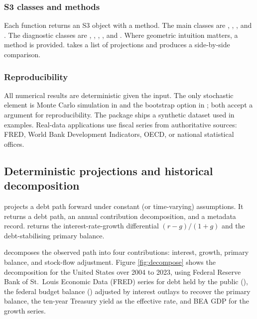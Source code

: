 \subsubsection{S3 classes and methods}\label{s3-classes-and-methods}

Each function returns an S3 object with a  method. The
main classes are , ,
, and . The diagnostic classes are
, , ,
, and . Where geometric
intuition matters, a  method is provided.
 takes a list of projections and produces a
side-by-side comparison.

\subsubsection{Reproducibility}\label{reproducibility}

All numerical results are deterministic given the input. The only
stochastic element is Monte Carlo simulation in 
and the bootstrap option in ; both accept a
 argument for reproducibility. The package ships a synthetic
 dataset used in examples. Real-data
applications use fiscal series from authoritative sources: FRED, World
Bank Development Indicators, OECD, or national statistical offices.

\subsection{Deterministic projections and historical
decomposition}\label{deterministic-projections-and-historical-decomposition}

 projects a debt path forward under constant (or
time-varying) assumptions. It returns a debt path, an annual
contribution decomposition, and a metadata record. 
returns the interest-rate-growth differential \((r-g)/(1+g)\) and the
debt-stabilising primary balance.

 decomposes the observed path into four contributions: interest,
growth, primary balance, and stock-flow adjustment. Figure
\ref{fig:decompose} shows the decomposition for the United States over
2004 to 2023, using Federal Reserve Bank of St.~Louis Economic Data
(FRED) series for debt held by the public (), the
federal budget balance () adjusted by interest outlays
to recover the primary balance, the ten-year Treasury yield as the
effective rate, and BEA GDP for the growth series.

